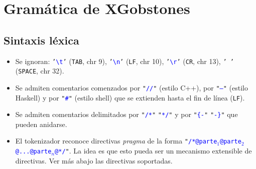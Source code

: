 \documentclass{article}
\begin{document}
\newcommand{\chr}[1]{\texttt{'}\textcolor{blue}{\texttt{#1}}\texttt{'}}
\newcommand{\str}[1]{\texttt{"}\textcolor{blue}{\texttt{#1}}\texttt{"}}
\newcommand{\token}[1]{\textcolor{red}{\texttt{#1}}}
\newcommand{\nonterminal}[1]{\textcolor{blue}{{\it$\langle$#1$\rangle$}}}
\newcommand{\nonEmpty}[1]{#1$_{1}$}
\newcommand{\production}[2]{
  \noindent
  \begin{tabular}{lrl}
  #1 & $\xrightarrow{\hspace{.5cm}}$ & #2
  \end{tabular}\\
}
\newcommand{\EMPTY}{$\epsilon$}
\newcommand{\ALT}{
  \\ & $\mid$ &
}
\newcommand{\ALTA}{
  $\mid$
}
\newcommand{\TODO}[1]{\textcolor{red}{****#1****}}

\newcommand{\type}[1]{\textcolor{blue}{\texttt{#1}}}
\renewcommand{\ast}[1]{\textcolor{darkgreen}{\texttt{\underline{#1}}}}
\newcommand{\typedecl}[2]{\noindent
  \begin{tabularx}{\textwidth}{lrlr}
  #1 & $=$ & #2
  \end{tabularx}\\
}
\newcommand{\datadecl}[2]{\noindent
  \begin{tabularx}{\textwidth}{lrp{13cm}r}
  #1 & $::=$ & #2
  \end{tabularx}\\
}

\newcommand{\PUEDE}{{\bf PUEDE}\xspace}
\newcommand{\PUEDEN}{{\bf PUEDEN}\xspace}
\newcommand{\NOPUEDE}{{\bf NO PUEDE}\xspace}
\newcommand{\NOPUEDEN}{{\bf NO PUEDEN}\xspace}
\newcommand{\DEBE}{{\bf DEBE}\xspace}
\newcommand{\DEBEN}{{\bf DEBEN}\xspace}

\section{Gram\'atica de XGobstones}

\subsection{Sintaxis l\'exica}

\begin{itemize}
\item Se ignoran:
\chr{\textbackslash t} (\texttt{TAB}, chr 9),
\chr{\textbackslash n} (\texttt{LF}, chr 10),
\chr{\textbackslash r} (\texttt{CR}, chr 13),
\chr{\,} (\texttt{SPACE}, chr 32).
\item Se admiten comentarios comenzados por \str{//} (estilo C++), por \str{--} (estilo Haskell) y por \str{\#} (estilo shell) que se extienden hasta el fin de l\'inea (\texttt{LF}).
\item Se admiten comentarios delimitados por \str{/*} \str{*/} y por \str{\{-} \str{-\}} que pueden anidarse.
\item El tokenizador reconoce directivas {\em pragma} de la forma \str{/*@parte$_1$@parte$_2$@...@parte$_n$@*/}. La idea es que esto pueda ser un mecanismo extensible de directivas. Ver m\'as abajo las directivas soportadas.
\end{itemize}
\end{document}
